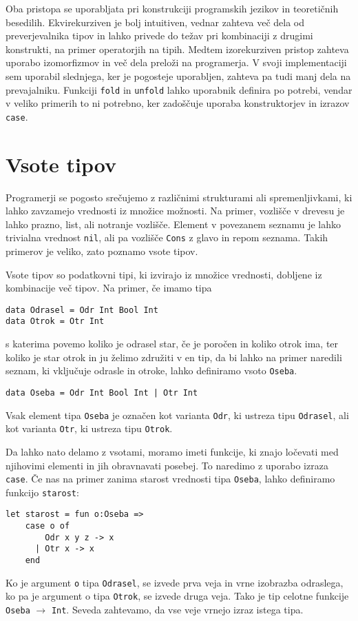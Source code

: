 \documentclass[12pt,a4paper,openany]{book}
\begin{document}
Oba pristopa se uporabljata pri konstrukciji programskih jezikov in teoretičnih besedilih. Ekvirekurziven je bolj intuitiven, vednar zahteva več dela od preverjevalnika tipov in 
lahko privede do težav pri kombinaciji z drugimi konstrukti, na primer operatorjih na tipih. Medtem izorekurziven pristop zahteva uporabo izomorfizmov in več dela preloži na programerja. 
V svoji implementaciji sem uporabil slednjega, ker je pogosteje uporabljen, zahteva pa tudi manj dela na prevajalniku. Funkciji \lstinline{fold} in \lstinline{unfold} lahko uporabnik definira po potrebi, 
vendar v veliko primerih to ni potrebno, ker zadoščuje uporaba konstruktorjev in izrazov \lstinline{case}.

\chapter{Vsote tipov}
Programerji se pogosto srečujemo z različnimi strukturami ali spremenljivkami, ki lahko zavzamejo vrednosti iz množice možnosti. Na primer, vozlišče v drevesu je lahko prazno, list, ali 
notranje vozlišče. Element v povezanem seznamu je lahko trivialna vrednost \lstinline{nil}, ali pa vozlišče \lstinline{Cons} z glavo in repom seznama. Takih primerov je veliko, zato poznamo vsote tipov.

Vsote tipov so podatkovni tipi, ki izvirajo iz množice vrednosti, dobljene iz kombinacije več tipov. Na primer, če imamo tipa
\begin{lstlisting}
data Odrasel = Odr Int Bool Int
data Otrok = Otr Int
\end{lstlisting}
s katerima povemo koliko je odrasel star, če je poročen in koliko otrok ima, ter koliko je star otrok in ju želimo združiti v en tip, da bi lahko na primer naredili seznam, ki vključuje odrasle in otroke, lahko definiramo vsoto \lstinline{Oseba}.
\begin{lstlisting}
data Oseba = Odr Int Bool Int | Otr Int
\end{lstlisting}
Vsak element tipa \lstinline{Oseba} je označen kot varianta \lstinline{Odr}, ki ustreza tipu \lstinline{Odrasel}, ali kot varianta \lstinline{Otr}, ki ustreza tipu \lstinline{Otrok}.

Da lahko nato delamo z vsotami, moramo imeti funkcije, ki znajo ločevati med njihovimi elementi in jih obravnavati posebej. To naredimo z uporabo izraza \lstinline{case}. Če nas na primer zanima 
starost vrednosti tipa \lstinline{Oseba}, lahko definiramo funkcijo \lstinline{starost}:
\begin{lstlisting}
let starost = fun o:Oseba =>
    case o of
        Odr x y z -> x
      | Otr x -> x
    end
\end{lstlisting}
Ko je argument \lstinline{o} tipa \lstinline{Odrasel}, se izvede prva veja in vrne izobrazba odraslega, ko pa je argument o tipa \lstinline{Otrok}, se izvede druga veja. Tako je tip celotne funkcije 
\lstinline{Oseba} $\rightarrow$ \lstinline{Int}. Seveda zahtevamo, da vse veje vrnejo izraz istega tipa.
\end{document}
